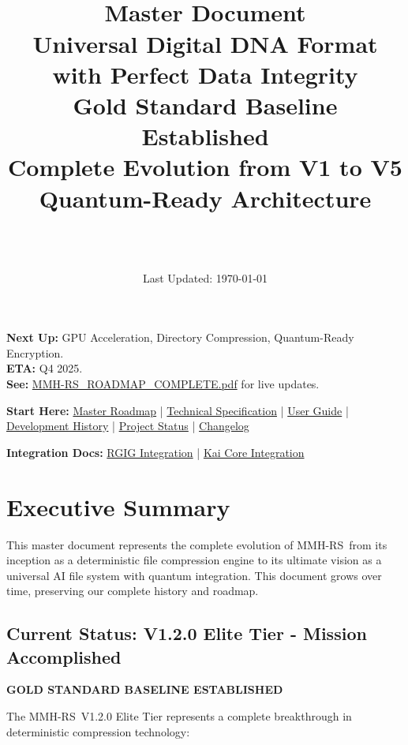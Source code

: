 \documentclass[12pt,a4paper]{article}
\title{\Huge\textbf{\project\ \version}\\[0.5cm]
\Large\textbf{Master Document}\\[0.3cm]
\large Universal Digital DNA Format with Perfect Data Integrity\\[0.5cm]
\large Gold Standard Baseline Established\\[0.3cm]
\large Complete Evolution from V1 to V5\\[0.3cm]
\large Quantum-Ready Architecture}
\author{\Large\authorname\\[0.2cm]\email\\[0.2cm]\github}
\date{\large Last Updated: \today}
\newcommand{\project}{MMH-RS}
\begin{document}
\maketitle
\thispagestyle{empty}

\begin{tcolorbox}[colback=orange!10,colframe=orange!50,title=\textbf{V2 GPU/Quantum Features in Active Development}]
\textbf{Next Up:} GPU Acceleration, Directory Compression, Quantum-Ready Encryption.\\
\textbf{ETA:} Q4 2025.\\
\textbf{See:} \href{MMH-RS_ROADMAP_COMPLETE.pdf}{MMH-RS\_ROADMAP\_COMPLETE.pdf} for live updates.
\end{tcolorbox}

\begin{tcolorbox}[colback=blue!10,colframe=blue!50,title=\textbf{Full Documentation Suite}]
\textbf{Start Here:} \href{MMH-RS_ROADMAP_COMPLETE.pdf}{Master Roadmap} | \href{MMH-RS_TECHNICAL_COMPLETE.pdf}{Technical Specification} | \href{USER_GUIDE.md}{User Guide} | \href{DEVELOPMENT_HISTORY.md}{Development History} | \href{PROJECT_STATUS.md}{Project Status} | \href{CHANGELOG.md}{Changelog}

\textbf{Integration Docs:} \href{RGIG_INTEGRATION_COMPLETE.pdf}{RGIG Integration} | \href{KAI_CORE_INTEGRATION_COMPLETE.pdf}{Kai Core Integration}
\end{tcolorbox}

\tableofcontents
\newpage

\section{Executive Summary}

This master document represents the complete evolution of \project\ from its inception as a deterministic file compression engine to its ultimate vision as a universal AI file system with quantum integration. This document grows over time, preserving our complete history and roadmap.

\subsection{Current Status: V1.2.0 Elite Tier - Mission Accomplished}

\textbf{GOLD STANDARD BASELINE ESTABLISHED}

The \project\ V1.2.0 Elite Tier represents a complete breakthrough in deterministic compression technology:
\end{document}
